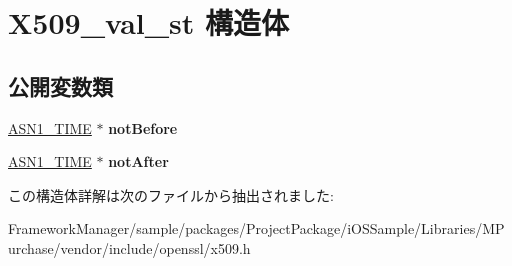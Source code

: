 \hypertarget{struct_x509__val__st}{}\section{X509\+\_\+val\+\_\+st 構造体}
\label{struct_x509__val__st}
\subsection*{公開変数類}
\begin{DoxyCompactItemize}
\item 
\hypertarget{struct_x509__val__st_a49893ccde75b6fb542b3188fe158530d}{}\hyperlink{structasn1__string__st}{A\+S\+N1\+\_\+\+T\+I\+M\+E} $\ast$ {\bfseries not\+Before}\label{struct_x509__val__st_a49893ccde75b6fb542b3188fe158530d}

\item 
\hypertarget{struct_x509__val__st_a9d46618a37d4511c009469509b883838}{}\hyperlink{structasn1__string__st}{A\+S\+N1\+\_\+\+T\+I\+M\+E} $\ast$ {\bfseries not\+After}\label{struct_x509__val__st_a9d46618a37d4511c009469509b883838}

\end{DoxyCompactItemize}


この構造体詳解は次のファイルから抽出されました\+:\begin{DoxyCompactItemize}
\item 
Framework\+Manager/sample/packages/\+Project\+Package/i\+O\+S\+Sample/\+Libraries/\+M\+Purchase/vendor/include/openssl/x509.\+h\end{DoxyCompactItemize}
